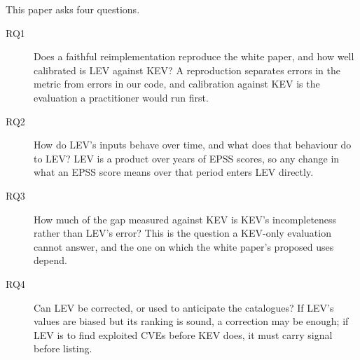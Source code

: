 This paper asks four questions.
\begin{description}
\item[RQ1] Does a faithful reimplementation reproduce the white paper, and how
well calibrated is LEV against KEV? A reproduction separates errors in the
metric from errors in our code, and calibration against KEV is the evaluation
a practitioner would run first.
\item[RQ2] How do LEV's inputs behave over time, and what does that behaviour
do to LEV? LEV is a product over years of EPSS scores, so any change in what an
EPSS score means over that period enters LEV directly.
\item[RQ3] How much of the gap measured against KEV is KEV's incompleteness
rather than LEV's error? This is the question a KEV-only evaluation cannot
answer, and the one on which the white paper's proposed uses depend.
\item[RQ4] Can LEV be corrected, or used to anticipate the catalogues? If
LEV's values are biased but its ranking is sound, a correction may be enough;
if LEV is to find exploited CVEs before KEV does, it must carry signal before
listing.
\end{description}

